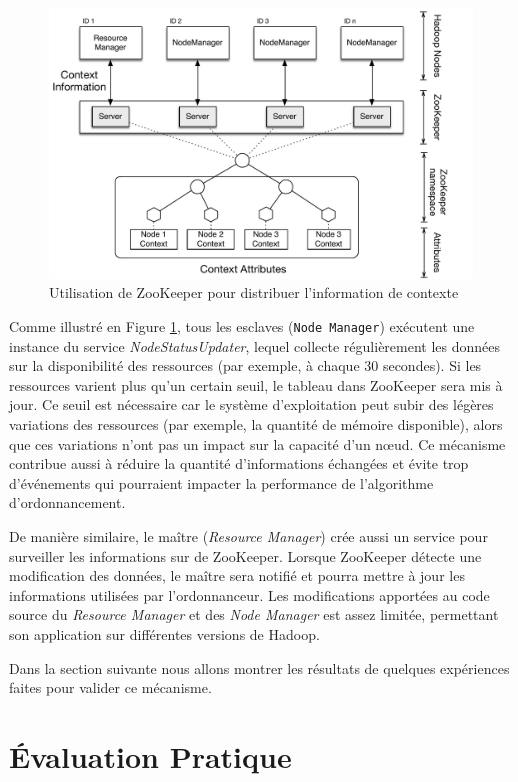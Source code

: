 \begin{figure}
	\centering
	\includegraphics[width=1\linewidth]{img/Zookeeper} 
	\caption{Utilisation de ZooKeeper pour distribuer l'information de contexte\label{fig:zookeeper}}
\end{figure}


Comme illustré en Figure \ref{fig:zookeeper}, tous les esclaves (\texttt{Node Manager}) exécutent une instance du service \textit{NodeStatusUpdater}, lequel collecte régulièrement les données sur la disponibilité des ressources (par exemple, à chaque 30 secondes). Si les ressources varient plus qu'un certain seuil, le tableau dans ZooKeeper sera mis à jour. Ce seuil est nécessaire car le système d'exploitation peut subir des légères variations des ressources (par exemple, la quantité de mémoire disponible), alors que ces variations n'ont pas un impact sur la capacité d'un n{\oe}ud. Ce mécanisme contribue aussi à réduire la quantité d'informations échangées et évite trop d'événements qui pourraient impacter la performance de l'algorithme d'ordonnancement. 

De manière similaire, le maître (\textit{Resource Manager}) crée aussi un service pour surveiller les informations sur de ZooKeeper. Lorsque ZooKeeper détecte une modification des données, le maître sera notifié et pourra mettre à jour les informations utilisées par l'ordonnanceur. Les modifications apportées au code source du \textit{Resource Manager} et des \textit{Node Manager} est assez limitée, permettant son application sur différentes versions de Hadoop.

Dans la section suivante nous allons montrer les résultats de quelques expériences faites pour valider ce mécanisme.


\section{Évaluation Pratique} \label{sec:exper}

